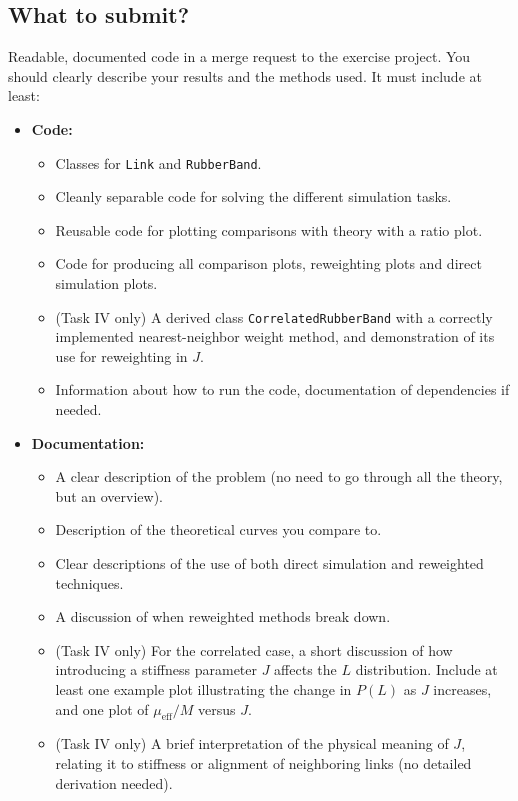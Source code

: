 \documentclass[11pt]{article}
\begin{document}
\subsection*{What to submit?}
Readable, documented code in a merge request to the exercise project. You should clearly describe your results and the methods used. It must include at least:
\begin{itemize}
  \item \textbf{Code:}
  \begin{itemize}
    \item Classes for \texttt{Link} and \texttt{RubberBand}.
    \item Cleanly separable code for solving the different simulation tasks.
    \item Reusable code for plotting comparisons with theory with a ratio plot.
    \item Code for producing all comparison plots, reweighting plots and direct simulation plots.
    \item (Task IV only) A derived class \texttt{CorrelatedRubberBand} with a correctly implemented nearest-neighbor weight method, and demonstration of its use for reweighting in $J$.
    \item Information about how to run the code, documentation of dependencies if needed.
  \end{itemize}
  \item \textbf{Documentation:}
  \begin{itemize}
    \item A clear description of the problem (no need to go through all the theory, but an overview).
    \item Description of the theoretical curves you compare to.
    \item Clear descriptions of the use of both direct simulation and reweighted techniques.
    \item A discussion of when reweighted methods break down.
    \item (Task IV only) For the correlated case, a short discussion of how introducing a stiffness parameter $J$ affects the $L$ distribution. Include at least one example plot illustrating the change in $P(L)$ as $J$ increases, and one plot of $\mu_\text{eff}/M$ versus $J$.
    \item (Task IV only) A brief interpretation of the physical meaning of $J$, relating it to stiffness or alignment of neighboring links (no detailed derivation needed).
  \end{itemize}
\end{itemize}
\end{document}
